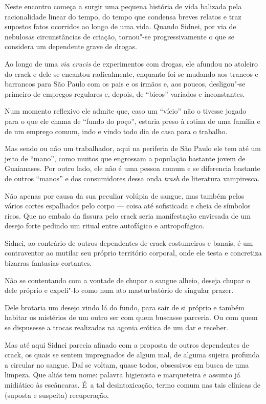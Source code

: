 \asterisc{}

Neste encontro começa a surgir uma pequena história de vida balizada pela
racionalidade linear do tempo, do tempo que condensa breves relatos e
traz supostos fatos ocorridos ao longo de uma vida. Quando Sidnei, por
via de nebulosas circunstâncias de criação, tornou"-se progressivamente o
que se considera um dependente grave de drogas.

Ao longo de uma \emph{via crucis} de experimentos com drogas, ele
afundou no atoleiro do crack e dele se encantou radicalmente, enquanto
foi se mudando aos trancos e barrancos para São Paulo com os pais e os
irmãos e, aos poucos, desligou"-se primeiro de empregos regulares e,
depois, de ``bicos'' variados e inconstantes.

Num momento reflexivo ele admite que, caso um ``vício'' não o tivesse
jogado para o que ele chama de ``fundo do poço'', estaria preso à rotina
de uma família e de um emprego comum, indo e vindo todo dia de casa para
o trabalho.

Mas sendo ou não um trabalhador, aqui na periferia de São Paulo ele tem
até um jeito de ``mano'', como muitos que engrossam a população bastante
jovem de Guaianases. Por outro lado, ele não é uma pessoa comum e se
diferencia bastante de outros ``manos'' e dos consumidores dessa onda
\emph{trash} de literatura vampiresca.

Não apenas por causa da sua peculiar volúpia de sangue, mas também pelos
vários cortes espalhados pelo corpo --- coisa até sofisticada e cheia de
símbolos ricos. Que no embalo da fissura pelo crack seria manifestação
enviesada de um desejo forte pedindo um ritual entre autofágico e
antropofágico.

Sidnei, ao contrário de outros dependentes de crack costumeiros e
banais, é um contraventor ao mutilar seu próprio território corporal, onde ele testa e concretiza bizarras fantasias cortantes.

Não se contentando com a vontade de chupar o sangue alheio, deseja
chupar o dele próprio e expelí"-lo como num ato masturbatório de singular
prazer.

Dele brotaria um desejo vindo lá do fundo, para sair de si próprio e
também habitar os mistérios de um outro ser com quem buscasse parceria.
Ou com quem se dispusesse a trocas realizadas na agonia erótica de um
dar e receber.

Mas até aqui Sidnei parecia afinado com a proposta de outros dependentes
de crack, os quais se sentem impregnados de algum mal, de alguma sujeira
profunda a circular no sangue. Daí se voltam, quase todos, obsessivos em
busca de uma limpeza. Que aliás tem nome: palavra higienista e
marqueteira e assunto já midiático às escâncaras. É~a tal
desintoxicação, termo comum nas tais clínicas de (suposta e suspeita)
recuperação.

